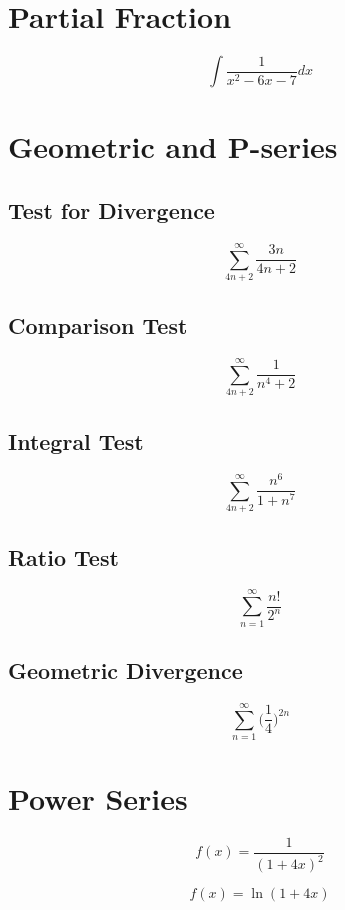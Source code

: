 \documentclass{article}
\begin{document}
\section{Partial Fraction}
\begin{equation*}
\int
\frac
{1}
{x^2-6x-7}
dx
\end{equation*}

\pagebreak
\section{Geometric and P-series}
\subsection{Test for Divergence}
\begin{equation*}
\sum^\infty_{4n+2}
\frac
{3n}
{4n+2}
\end{equation*}
\vspace{1.5in}
\subsection{Comparison Test}
\begin{equation*}
\sum^\infty_{4n+2}
\frac
{1}
{n^4+2}
\end{equation*}

\vspace{1.5in} 
\subsection{Integral Test}
\begin{equation*}
\sum^\infty_{4n+2}
\frac
{n^6}
{1+n^7}
\end{equation*}

\vspace{1.5in}
\pagebreak
\subsection{Ratio Test}
\begin{equation*}
	\sum^\infty_{n=1}
	\frac
	{n!}
	{2^n}
\end{equation*}

\vspace{3.5in} 
\subsection{Geometric Divergence}
\begin{equation*}
	\sum^\infty_{n=1}
	\bigg(
	\frac
	{1}
	{4}
	\bigg)^{2n}
\end{equation*}

\pagebreak
\section{Power Series}
\begin{equation*}
	f(x)=
	\frac
	{1}
	{(1+4x)^2}
\end{equation*}

\vspace{3.5in} 
\begin{equation*}
	f(x)=
	\ln(1+4x)
\end{equation*}
\end{document}
